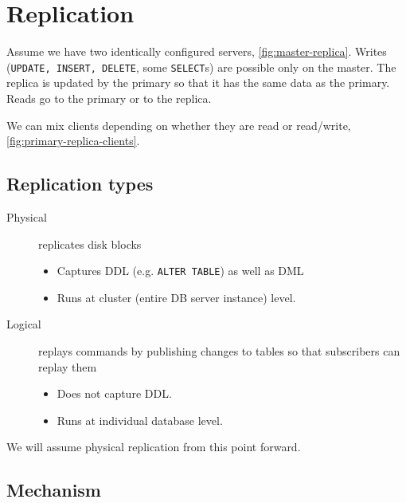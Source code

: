 \documentclass[slides]{pgnotes}
\begin{document}
\section{Replication}

Assume we have two identically configured servers, \autoref{fig:master-replica}.
Writes (\texttt{UPDATE, INSERT, DELETE}, some \texttt{SELECT}s) are possible only on the master.
The replica is updated by the primary so that it has the same data as the primary.
Reads go to the primary or to the replica.


We can mix clients depending on whether they are read or read/write, \autoref{fig:primary-replica-clients}.


\subsection{Replication types}

\begin{description}
\item[Physical] replicates disk blocks
  \begin{itemize}
  \item Captures DDL (e.g. \texttt{ALTER TABLE}) as well as DML
  \item Runs at cluster (entire DB server instance) level.
  \end{itemize}
\item[Logical] replays commands by publishing changes to tables so that subscribers can replay them
  \begin{itemize}
  \item Does not capture DDL.
  \item Runs at individual database level. 
  \end{itemize}
\end{description}
We will assume physical replication from this point forward.

\subsection{Mechanism}
\end{document}

